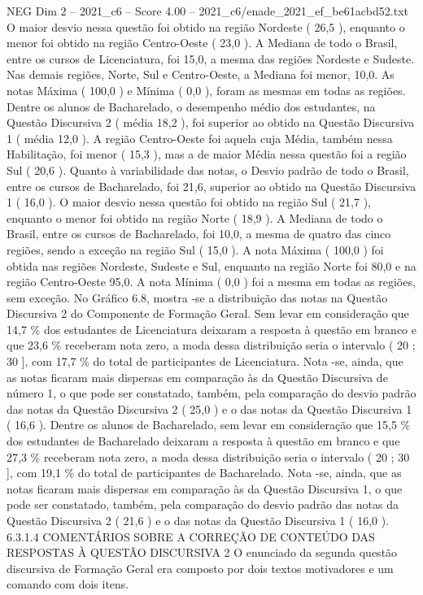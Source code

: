 \begin{textsample}{NEG Dim 2 – 2021\_c6 – Score 4.00 – 2021\_c6/enade\_2021\_ef\_be61acbd52.txt}
O maior desvio nessa questão foi obtido na região Nordeste ( 26,5 ), enquanto o menor foi obtido na região Centro-Oeste ( 23,0 ).
A Mediana de todo o Brasil, entre os cursos de Licenciatura, foi 15,0, a mesma das regiões Nordeste e Sudeste.
Nas demais regiões, Norte, Sul e Centro-Oeste, a Mediana foi menor, 10,0.
As notas Máxima ( 100,0 ) e Mínima ( 0,0 ), foram as mesmas em todas as regiões.
Dentre os alunos de Bacharelado, o desempenho médio dos estudantes, na Questão Discursiva 2 ( média 18,2 ), foi superior ao obtido na Questão Discursiva 1 ( média 12,0 ).
A região Centro-Oeste foi aquela cuja Média, também nessa Habilitação, foi menor ( 15,3 ), mas a de maior Média nessa questão foi a região Sul ( 20,6 ).
Quanto à variabilidade das notas, o Desvio padrão de todo o Brasil, entre os cursos de Bacharelado, foi 21,6, superior ao obtido na Questão Discursiva 1 ( 16,0 ).
O maior desvio nessa questão foi obtido na região Sul ( 21,7 ), enquanto o menor foi obtido na região Norte ( 18,9 ).
A Mediana de todo o Brasil, entre os cursos de Bacharelado, foi 10,0, a mesma de quatro das cinco regiões, sendo a exceção na região Sul ( 15,0 ).
A nota Máxima ( 100,0 ) foi obtida nas regiões Nordeste, Sudeste e Sul, enquanto na região Norte foi 80,0 e na região Centro-Oeste 95,0.
A nota Mínima ( 0,0 ) foi a mesma em todas as regiões, sem exceção.
No Gráfico 6.8, mostra -se a distribuição das notas na Questão Discursiva 2 do Componente de Formação Geral.
Sem levar em consideração que 14,7 \% dos estudantes de Licenciatura deixaram a resposta à questão em branco e que 23,6 \% receberam nota zero, a moda dessa distribuição seria o intervalo ( 20 ; 30 ], com 17,7 \% do total de participantes de Licenciatura.
Nota -se, ainda, que as notas ficaram mais dispersas em comparação às da Questão Discursiva de número 1, o que pode ser constatado, também, pela comparação do desvio padrão das notas da Questão Discursiva 2 ( 25,0 ) e o das notas da Questão Discursiva 1 ( 16,6 ).
Dentre os alunos de Bacharelado, sem levar em consideração que 15,5 \% dos estudantes de Bacharelado deixaram a resposta à questão em branco e que 27,3 \% receberam nota zero, a moda dessa distribuição seria o intervalo ( 20 ; 30 ], com 19,1 \% do total de participantes de Bacharelado.
Nota -se, ainda, que as notas ficaram mais dispersas em comparação às da Questão Discursiva 1, o que pode ser constatado, também, pela comparação do desvio padrão das notas da Questão Discursiva 2 ( 21,6 ) e o das notas da Questão Discursiva 1 ( 16,0 ). 6.3.1.4 COMENTÁRIOS SOBRE A CORREÇÃO DE CONTEÚDO DAS RESPOSTAS À QUESTÃO DISCURSIVA 2 O enunciado da segunda questão discursiva de Formação Geral era composto por dois textos motivadores e um comando com dois itens.

\end{textsample}
